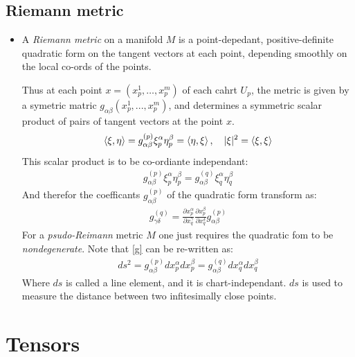 \documentclass[11pt]{article}
\numberwithin{equation}{section}
\begin{document}
\subsection{Riemann metric}
\begin{itemize}
  \item A \emph{Riemann metric} on a manifold $M$ is a point-depedant, positive-definite quadratic form on the tangent vectors at each point, depending smoothly on the local co-ords of the points. 

  Thus at each point $x = (x^{1}_{p},\ldots,x^{m}_p)$ of each cahrt $U_{p}$, the metric is given by a symetric matric $g_{\alpha\beta}(x^{1}_{p},...,x^{m}_p)$, and determines a symmetric scalar product of pairs of tangent vectors at the point $x$. 
  \begin{align*}
     \braket{\xi, \eta}  = g_{\alpha\beta}^{(p)}\xi^{\alpha}_{p}\eta^{\beta}_{p} = \braket{\eta,\xi}, ~~~ |\xi|^2 = \braket{\xi,\xi}
   \end{align*} 
   This scalar product is to be co-ordiante independant:
   \begin{align*}
     g_{\alpha\beta}^{(p)}\xi^{\alpha}_{p}\eta^{\beta}_{p} = g_{\alpha\beta}^{(q)}\xi^{\alpha}_{q}\eta^{\beta}_{q}
   \end{align*}
   And therefor the coefficants $g_{\alpha\beta}^{(p)}$ of the quadratic form transform as:
   \begin{align}
   \label{g}
     g_{\gamma\delta}^{(q)}  = \frac{\partial x^{\alpha}_{p}}{\partial x^{\gamma}_{q}}\frac{\partial x^{\beta}_p}{\partial x^{\delta}_{q}}g_{\alpha\beta}^{(p)} 
   \end{align}
   For a \emph{psudo-Reimann} metric $M$ one just requires the quadratic fom to be \emph{nondegenerate}. Note that \ref{g} can be re-written as:
   \begin{align*}
     ds^2 = g_{\alpha\beta}^{(p)}dx^{\alpha}_{p}dx^{\beta}_{p} =g_{\alpha\beta}^{(q)}dx^{\alpha}_{q}dx^{\beta}_{q}  
   \end{align*}
   Where $ds$ is called a line element, and it is chart-independant. $ds$ is used to measure the distance between two infitesimally close points. 
\end{itemize}

\newpage 
\section{Tensors}
\end{document}
